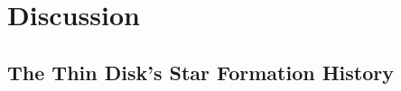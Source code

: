 \documentclass[11pt,twocolumn,tighten]{aastex63}
\begin{document}
%  
%  


\section{Discussion}
\label{sec:disc}

\subsection{The Thin Disk's Star Formation History}
\end{document}
